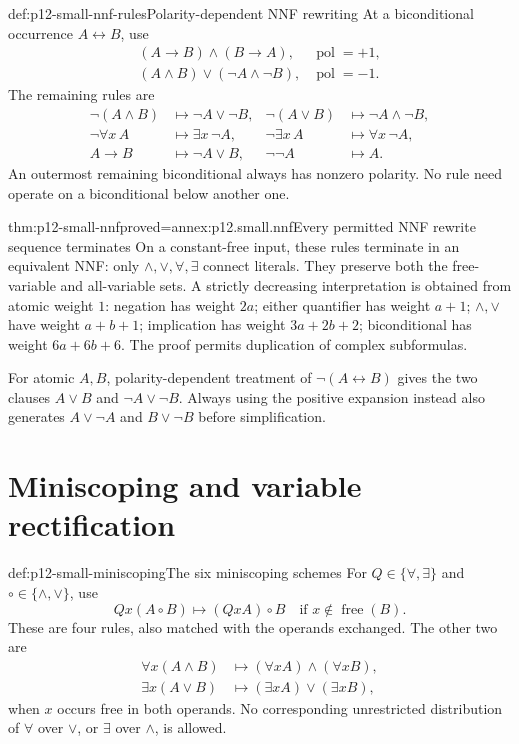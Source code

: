 \begin{hbmethod}{def:p12-small-nnf-rules}{Polarity-dependent NNF rewriting}
At a biconditional occurrence \(A\leftrightarrow B\), use
\[
\begin{array}{ll}
(A\to B)\land(B\to A),&\operatorname{pol}=+1,\\
(A\land B)\lor(\neg A\land\neg B),&\operatorname{pol}=-1.
\end{array}
\]
The remaining rules are
\[
\begin{aligned}
\neg(A\land B)&\longmapsto\neg A\lor\neg B,&
\neg(A\lor B)&\longmapsto\neg A\land\neg B,\\
\neg\forall x\,A&\longmapsto\exists x\,\neg A,&
\neg\exists x\,A&\longmapsto\forall x\,\neg A,\\
A\to B&\longmapsto\neg A\lor B,&
\neg\neg A&\longmapsto A .
\end{aligned}
\]
An outermost remaining biconditional always has nonzero polarity.
No rule need operate on a biconditional below another one.
\end{hbmethod}

\begin{hbtheorem}{thm:p12-small-nnf}{proved=annex:p12.small.nnf}{Every permitted NNF rewrite sequence terminates}
On a constant-free input, these rules terminate in an equivalent NNF:
only \(\land,\lor,\forall,\exists\) connect literals.
They preserve both the free-variable and all-variable sets.
A strictly decreasing interpretation is obtained from atomic weight \(1\):
negation has weight \(2a\); either quantifier has weight \(a+1\);
\(\land,\lor\) have weight \(a+b+1\); implication has weight
\(3a+2b+2\); biconditional has weight \(6a+6b+6\).
The proof permits duplication of complex subformulas.

For atomic \(A,B\), polarity-dependent treatment of
\(\neg(A\leftrightarrow B)\) gives the two clauses
\(A\lor B\) and \(\neg A\lor\neg B\).
Always using the positive expansion instead also generates
\(A\lor\neg A\) and \(B\lor\neg B\) before simplification.
\end{hbtheorem}

\section{Miniscoping and variable rectification}

\begin{hbmethod}{def:p12-small-miniscoping}{The six miniscoping schemes}
For \(Q\in\{\forall,\exists\}\) and
\(\circ\in\{\land,\lor\}\), use
\[
            Qx(A\circ B)\longmapsto(Qx A)\circ B
                \quad\text{if }x\notin\operatorname{free}(B).
\]
These are four rules, also matched with the operands exchanged.
The other two are
\[
\begin{aligned}
\forall x(A\land B)&\longmapsto(\forall x A)\land(\forall x B),\\
\exists x(A\lor B)&\longmapsto(\exists x A)\lor(\exists x B),
\end{aligned}
\]
when \(x\) occurs free in both operands.
No corresponding unrestricted distribution of \(\forall\) over
\(\lor\), or \(\exists\) over \(\land\), is allowed.
\end{hbmethod}

